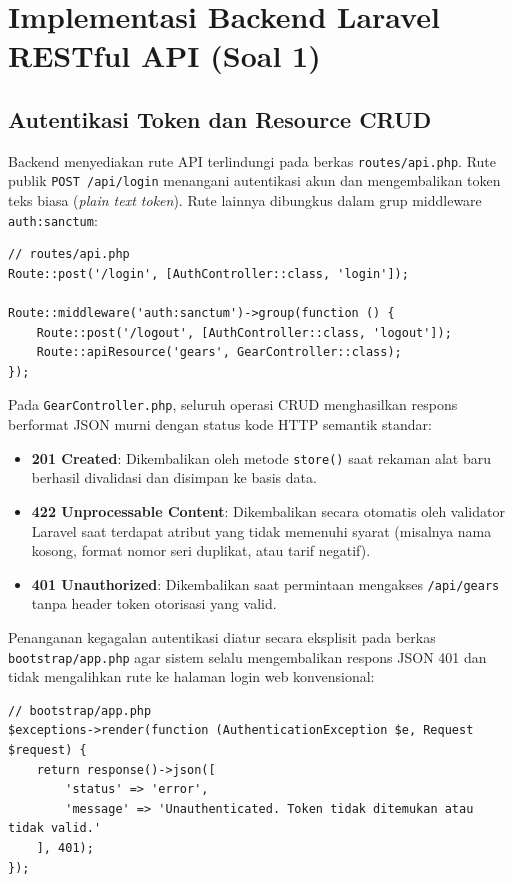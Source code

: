 \documentclass[a4paper,oneside,11pt]{book}
\begin{document}
\section{Implementasi Backend Laravel RESTful API (Soal 1)}

\subsection{Autentikasi Token dan Resource CRUD}
Backend menyediakan rute API terlindungi pada berkas \texttt{routes/api.php}. Rute publik \texttt{POST /api/login} menangani autentikasi akun dan mengembalikan token teks biasa (\textit{plain text token}). Rute lainnya dibungkus dalam grup middleware \texttt{auth:sanctum}:
\begin{lstlisting}[style=codestyle]
// routes/api.php
Route::post('/login', [AuthController::class, 'login']);

Route::middleware('auth:sanctum')->group(function () {
    Route::post('/logout', [AuthController::class, 'logout']);
    Route::apiResource('gears', GearController::class);
});
\end{lstlisting}

Pada \texttt{GearController.php}, seluruh operasi CRUD menghasilkan respons berformat JSON murni dengan status kode HTTP semantik standar:
\begin{itemize}
\item \textbf{201 Created}: Dikembalikan oleh metode \texttt{store()} saat rekaman alat baru berhasil divalidasi dan disimpan ke basis data.
\item \textbf{422 Unprocessable Content}: Dikembalikan secara otomatis oleh validator Laravel saat terdapat atribut yang tidak memenuhi syarat (misalnya nama kosong, format nomor seri duplikat, atau tarif negatif).
\item \textbf{401 Unauthorized}: Dikembalikan saat permintaan mengakses \texttt{/api/gears} tanpa header token otorisasi yang valid.
\end{itemize}

Penanganan kegagalan autentikasi diatur secara eksplisit pada berkas \texttt{bootstrap/app.php} agar sistem selalu mengembalikan respons JSON 401 dan tidak mengalihkan rute ke halaman login web konvensional:
\begin{lstlisting}[style=codestyle]
// bootstrap/app.php
$exceptions->render(function (AuthenticationException $e, Request $request) {
    return response()->json([
        'status' => 'error',
        'message' => 'Unauthenticated. Token tidak ditemukan atau tidak valid.'
    ], 401);
});
\end{lstlisting}
\end{document}
